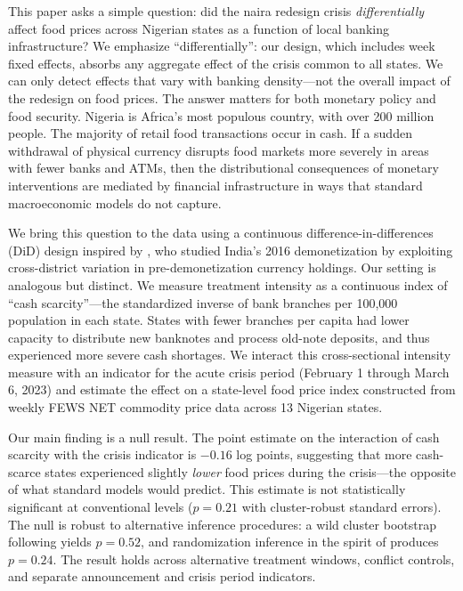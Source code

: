 \documentclass[12pt]{article}
\begin{document}
This paper asks a simple question: did the naira redesign crisis \textit{differentially} affect food prices across Nigerian states as a function of local banking infrastructure? We emphasize ``differentially'': our design, which includes week fixed effects, absorbs any aggregate effect of the crisis common to all states. We can only detect effects that vary with banking density---not the overall impact of the redesign on food prices. The answer matters for both monetary policy and food security. Nigeria is Africa's most populous country, with over 200 million people. The majority of retail food transactions occur in cash. If a sudden withdrawal of physical currency disrupts food markets more severely in areas with fewer banks and ATMs, then the distributional consequences of monetary interventions are mediated by financial infrastructure in ways that standard macroeconomic models do not capture.

We bring this question to the data using a continuous difference-in-differences (DiD) design inspired by \citet{chodorow2020cash}, who studied India's 2016 demonetization by exploiting cross-district variation in pre-demonetization currency holdings. Our setting is analogous but distinct. We measure treatment intensity as a continuous index of ``cash scarcity''---the standardized inverse of bank branches per 100,000 population in each state. States with fewer branches per capita had lower capacity to distribute new banknotes and process old-note deposits, and thus experienced more severe cash shortages. We interact this cross-sectional intensity measure with an indicator for the acute crisis period (February 1 through March 6, 2023) and estimate the effect on a state-level food price index constructed from weekly FEWS NET commodity price data across 13 Nigerian states.

Our main finding is a null result. The point estimate on the interaction of cash scarcity with the crisis indicator is $-0.16$ log points, suggesting that more cash-scarce states experienced slightly \textit{lower} food prices during the crisis---the opposite of what standard models would predict. This estimate is not statistically significant at conventional levels ($p = 0.21$ with cluster-robust standard errors). The null is robust to alternative inference procedures: a wild cluster bootstrap following \citet{webb2022reworking} yields $p = 0.52$, and randomization inference in the spirit of \citet{fisher1935design} produces $p = 0.24$. The result holds across alternative treatment windows, conflict controls, and separate announcement and crisis period indicators.
\end{document}
